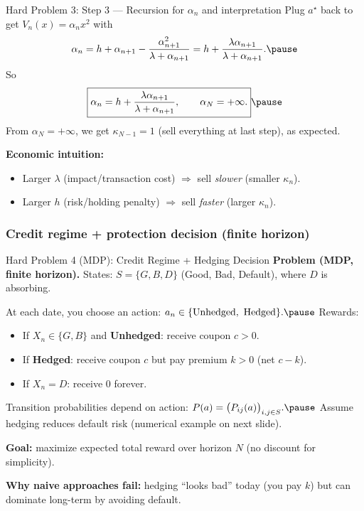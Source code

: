 \documentclass[aspectratio=169]{beamer}
\begin{document}
\begin{frame}{Hard Problem 3: Step 3 --- Recursion for $\alpha_n$ and interpretation}
Plug $a^\star$ back to get $V_n(x)=\alpha_n x^2$ with
\[
\alpha_n
=
h+\alpha_{n+1}-\frac{\alpha_{n+1}^2}{\lambda+\alpha_{n+1}}
=
h+\frac{\lambda\alpha_{n+1}}{\lambda+\alpha_{n+1}}.\pause
\]
So
\[
\boxed{\alpha_n=h+\frac{\lambda\alpha_{n+1}}{\lambda+\alpha_{n+1}},\qquad \alpha_N=+\infty.}\pause
\]
From $\alpha_N=+\infty$, we get $\kappa_{N-1}=1$ (sell everything at last step), as expected.\pause

\medskip
\textbf{Economic intuition:}
\begin{itemize}
\item Larger $\lambda$ (impact/transaction cost) $\Rightarrow$ sell \emph{slower} (smaller $\kappa_n$).\pause
\item Larger $h$ (risk/holding penalty) $\Rightarrow$ sell \emph{faster} (larger $\kappa_n$).
\end{itemize}
\end{frame}

\subsubsection{Credit regime + protection decision (finite horizon)}

\begin{frame}{Hard Problem 4 (MDP): Credit Regime + Hedging Decision}
\textbf{Problem (MDP, finite horizon).}
States: $S=\{G,B,D\}$ (Good, Bad, Default), where $D$ is absorbing.\pause

At each date, you choose an action:
$
a_n\in\{\text{Unhedged},\ \text{Hedged}\}.\pause
$
Rewards:
\begin{itemize}
\item If $X_n\in\{G,B\}$ and \textbf{Unhedged}: receive coupon $c>0$.\pause
\item If \textbf{Hedged}: receive coupon $c$ but pay premium $k>0$ (net $c-k$).\pause
\item If $X_n=D$: receive $0$ forever.\pause
\end{itemize}

Transition probabilities depend on action:
$
P(a)=\big(P_{ij}(a)\big)_{i,j\in S}.\pause
$
Assume hedging reduces default risk (numerical example on next slide).\pause

\textbf{Goal:} maximize expected total reward over horizon $N$ (no discount for simplicity).\pause

\textbf{Why naive approaches fail:}
hedging “looks bad” today (you pay $k$) but can dominate long-term by avoiding default.
\end{frame}
\end{document}
